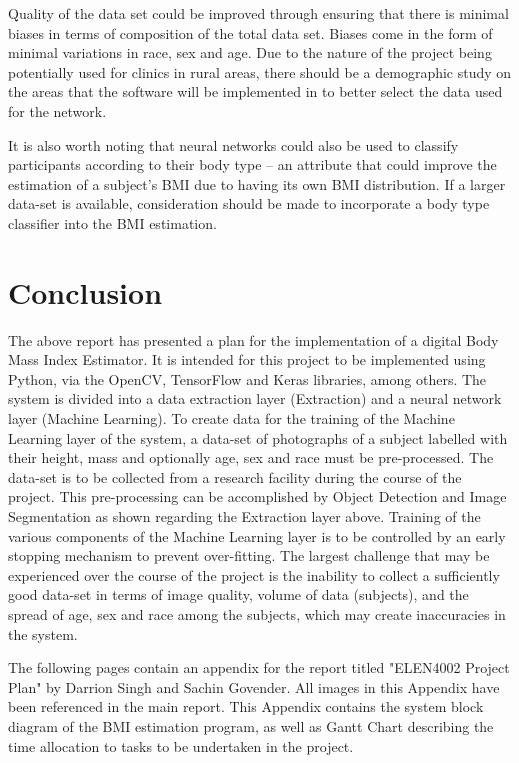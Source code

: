 \documentclass[conference]{IEEEtran}
\begin{document}
Quality of the data set could be improved through ensuring that there is minimal biases in terms of composition of the total data set.
Biases come in the form of minimal variations in race, sex and age.
Due to the nature of the project being potentially used for clinics in rural areas, there should be a demographic study on the areas that the
software will be implemented in to better select the data used for the network.

It is also worth noting that neural networks could also be used to classify participants according to their body type -- an attribute that could improve the estimation of a subject's BMI due to having its own BMI distribution. 
If a larger data-set is available, consideration should be made to incorporate a body type classifier into the BMI estimation.

\section{Conclusion}
The above report has presented a plan for the implementation of a digital Body Mass Index Estimator.
It is intended for this project to be implemented using Python, via the OpenCV, TensorFlow and Keras libraries, among others.
The system is divided into a data extraction layer (Extraction) and a neural network layer (Machine Learning).
To create data for the training of the Machine Learning layer of the system, a data-set of photographs of a subject labelled with their height, mass and optionally age, sex and race must be pre-processed.
The data-set is to be collected from a research facility during the course of the project.
This pre-processing can be accomplished by Object Detection and Image Segmentation as shown regarding the Extraction layer above.
Training of the various components of the Machine Learning layer is to be controlled by an early stopping mechanism to prevent over-fitting.
The largest challenge that may be experienced over the course of the project is the inability to collect a sufficiently good data-set in terms of image quality, volume of data (subjects), and the spread of age, sex and race among the subjects, which may create inaccuracies in the system.


\appendix
The following pages contain an appendix for the report titled "ELEN4002 Project Plan" by Darrion Singh and Sachin Govender.
All images in this Appendix have been referenced in the main report.
This Appendix contains the system block diagram of the BMI estimation program, as well as Gantt Chart describing the time allocation to tasks to be undertaken in the project.
\end{document}
